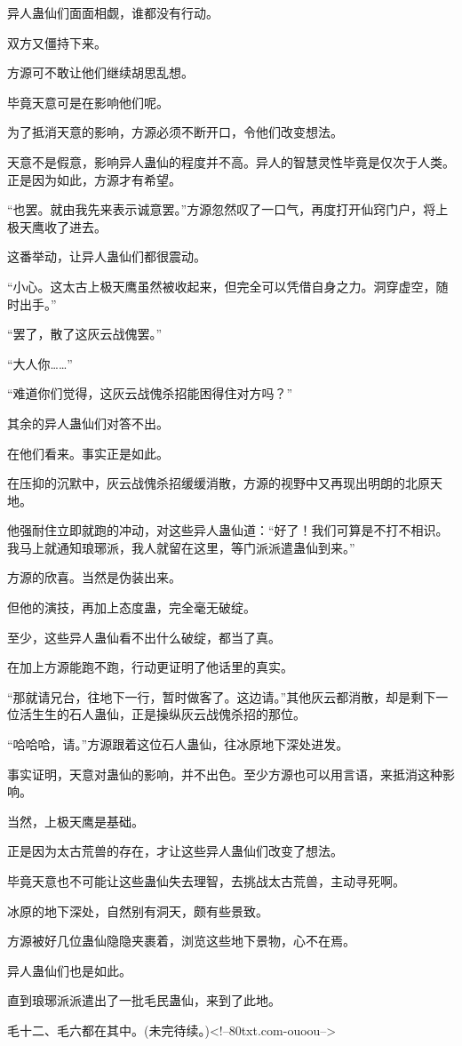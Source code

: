 \begin{this_body}
异人蛊仙们面面相觑，谁都没有行动。

双方又僵持下来。

方源可不敢让他们继续胡思乱想。

毕竟天意可是在影响他们呢。

为了抵消天意的影响，方源必须不断开口，令他们改变想法。

天意不是假意，影响异人蛊仙的程度并不高。异人的智慧灵性毕竟是仅次于人类。正是因为如此，方源才有希望。

“也罢。就由我先来表示诚意罢。”方源忽然叹了一口气，再度打开仙窍门户，将上极天鹰收了进去。

这番举动，让异人蛊仙们都很震动。

“小心。这太古上极天鹰虽然被收起来，但完全可以凭借自身之力。洞穿虚空，随时出手。”

“罢了，散了这灰云战傀罢。”

“大人你……”

“难道你们觉得，这灰云战傀杀招能困得住对方吗？”

其余的异人蛊仙们对答不出。

在他们看来。事实正是如此。

在压抑的沉默中，灰云战傀杀招缓缓消散，方源的视野中又再现出明朗的北原天地。

他强耐住立即就跑的冲动，对这些异人蛊仙道：“好了！我们可算是不打不相识。我马上就通知琅琊派，我人就留在这里，等门派派遣蛊仙到来。”

方源的欣喜。当然是伪装出来。

但他的演技，再加上态度蛊，完全毫无破绽。

至少，这些异人蛊仙看不出什么破绽，都当了真。

在加上方源能跑不跑，行动更证明了他话里的真实。

“那就请兄台，往地下一行，暂时做客了。这边请。”其他灰云都消散，却是剩下一位活生生的石人蛊仙，正是操纵灰云战傀杀招的那位。

“哈哈哈，请。”方源跟着这位石人蛊仙，往冰原地下深处进发。

事实证明，天意对蛊仙的影响，并不出色。至少方源也可以用言语，来抵消这种影响。

当然，上极天鹰是基础。

正是因为太古荒兽的存在，才让这些异人蛊仙们改变了想法。

毕竟天意也不可能让这些蛊仙失去理智，去挑战太古荒兽，主动寻死啊。

冰原的地下深处，自然别有洞天，颇有些景致。

方源被好几位蛊仙隐隐夹裹着，浏览这些地下景物，心不在焉。

异人蛊仙们也是如此。

直到琅琊派派遣出了一批毛民蛊仙，来到了此地。

毛十二、毛六都在其中。(未完待续。)<!--80txt.com-ouoou-->

\end{this_body}

